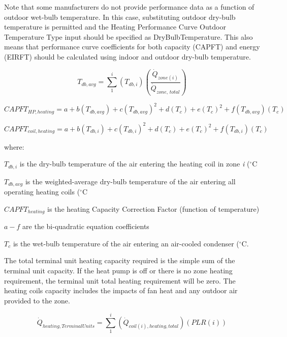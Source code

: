 Note that some manufacturers do not provide performance data as a function of outdoor wet-bulb temperature. In this case, substituting outdoor dry-bulb temperature is permitted and the Heating Performance Curve Outdoor Temperature Type input should be specified as DryBulbTemperature. This also means that performance curve coefficients for both capacity (CAPFT) and energy (EIRFT) should be calculated using indoor and outdoor dry-bulb temperature.

\begin{equation}
  T_{db,avg} = \sum\limits_1^i \left( T_{db,i} \right) \left( \frac{\dot{Q}_{zone(i)}}{\dot{Q}_{zone,\,total}} \right)
\end{equation}

\begin{equation}
  CAPFT_{HP,heating} = a + b \left( T_{db,avg} \right) + c \left( T_{db,avg} \right)^2 + d \left( T_c \right) + e \left( T_c \right)^2 + f \left( T_{db,avg} \right) \left( T_c \right)
\end{equation}

\begin{equation}
  CAPFT_{coil,heating} = a + b \left( T_{db,i} \right) + c \left( T_{db,i} \right)^2 + d \left( T_c \right) + e \left( T_c \right)^2 + f \left( T_{db,i} \right) \left( T_c \right)
\end{equation}

where:

\(T_{db,i}\) is the dry-bulb temperature of the air entering the heating coil in zone \emph{i} (\(^{\circ}\)C

\(T_{db,avg}\) is the weighted-average dry-bulb temperature of the air entering all operating heating coils (\(^{\circ}\)C

\(CAPFT_{heating}\) is the heating Capacity Correction Factor (function of temperature)

\(a - f\) are the bi-quadratic equation coefficients

\(T_c\) is the wet-bulb temperature of the air entering an air-cooled condenser (\(^{\circ}\)C.

The total terminal unit heating capacity required is the simple sum of the terminal unit capacity. If the heat pump is off or there is no zone heating requirement, the terminal unit total heating requirement will be zero. The heating coils capacity includes the impacts of fan heat and any outdoor air provided to the zone.

\begin{equation}
  \dot{Q}_{heating,TerminalUnits} = \sum\limits_1^i \left( \dot{Q}_{coil(i),heating,total} \right) \left( PLR(i) \right)
\end{equation}

